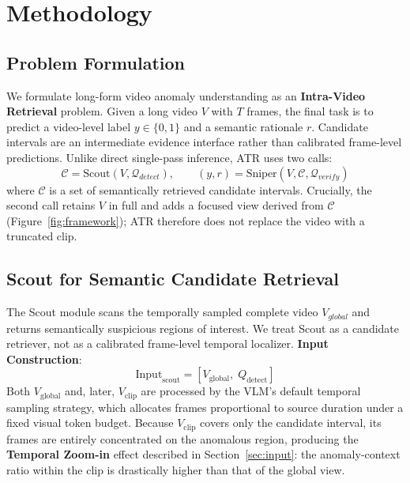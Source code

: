 \section{Methodology}

\subsection{Problem Formulation}
\label{sec:method_overview}

We formulate long-form video anomaly understanding as an \textbf{Intra-Video Retrieval} problem. Given a long video $V$ with $T$ frames, the final task is to predict a video-level label $y\in\{0,1\}$ and a semantic rationale $r$. Candidate intervals are an intermediate evidence interface rather than calibrated frame-level predictions.
Unlike direct single-pass inference, ATR uses two calls:
\begin{equation}
    \mathcal{C} = \text{Scout}(V, \mathcal{Q}_{detect}), \qquad
    (y,r) = \text{Sniper}(V, \mathcal{C}, \mathcal{Q}_{verify})
\end{equation}
where $\mathcal{C}$ is a set of semantically retrieved candidate intervals. Crucially, the second call retains $V$ in full and adds a focused view derived from $\mathcal{C}$ (Figure~\ref{fig:framework}); ATR therefore does not replace the video with a truncated clip.

\subsection{Scout for Semantic Candidate Retrieval}
\label{sec:scout}

The Scout module scans the temporally sampled complete video $V_{global}$ and returns semantically suspicious regions of interest. We treat Scout as a candidate retriever, not as a calibrated frame-level temporal localizer.
\textbf{Input Construction}:
\begin{equation}
  \text{Input}_{\text{scout}} = [V_{\text{global}},\; Q_{\text{detect}}]
  \label{eq:scout_input}
\end{equation}
Both $V_{\text{global}}$ and, later, $V_{\text{clip}}$ are processed by the VLM's default temporal sampling strategy, which allocates frames proportional to source duration under a fixed visual token budget. Because $V_{\text{clip}}$ covers only the candidate interval, its frames are entirely concentrated on the anomalous region, producing the \textbf{Temporal Zoom-in} effect described in Section~\ref{sec:input}: the anomaly-context ratio within the clip is drastically higher than that of the global view.



